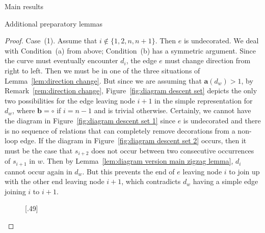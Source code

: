 \documentclass[11pt]{amsart}
\theoremstyle{definition}
\numberwithin{equation}{section}
\newcommand{\x}{\mathsf{x}}
\renewcommand{\a}{\mathbf{a}}
\newcommand{\wcirc}{\circ}
\renewcommand{\(}{\left(}
\renewcommand{\)}{\right)}
\begin{document}
\begin{section}{Main results}
\begin{subsection}{Additional preparatory lemmas}
\begin{proof}
Case~(1).  Assume that $i \notin \{1, 2, n, n+1\}$.  Then $e$ is undecorated.  We deal with Condition~(a) from above; Condition~(b) has a symmetric argument.  Since the curve must eventually encounter $d_{i}$, the edge $e$ must change direction from right to left.  Then we must be in one of the three situations of Lemma~\ref{lem:direction change}.  But since we are assuming that $\a(d_{w})>1$, by Remark~\ref{rem:direction change}, Figure~\ref{fig:diagram descent set} depicts the only two possibilities for the edge leaving node $i+1$ in the simple representation for $d_{w}$, where $\mathbf{b}=\wcirc$ if $i=n-1$ and is trivial otherwise.  Certainly, we cannot have the diagram in Figure~\ref{fig:diagram descent set 1} since $e$ is undecorated and there is no sequence of relations that can completely remove decorations from a non-loop edge.  If the diagram in Figure~\ref{fig:diagram descent set 2} occurs, then it must be the case that $s_{i+2}$ does not occur between two consecutive occurrences of $s_{i+1}$ in $w$.  Then by Lemma~\ref{lem:diagram version main zigzag lemma}, $d_{i}$ cannot occur again in $d_{w}$.  But this prevents the end of $e$ leaving node $i$ to join up with the other end leaving node $i+1$, which contradicts $d_{w}$ having a simple edge joining $i$ to $i+1$.

\begin{figure}[!ht]
\centering
\subcaptionbox{\label{fig:diagram descent set 1}}[.49\linewidth]{
}
\end{figure}
\end{proof}
\end{subsection}
\end{section}
\end{document}
